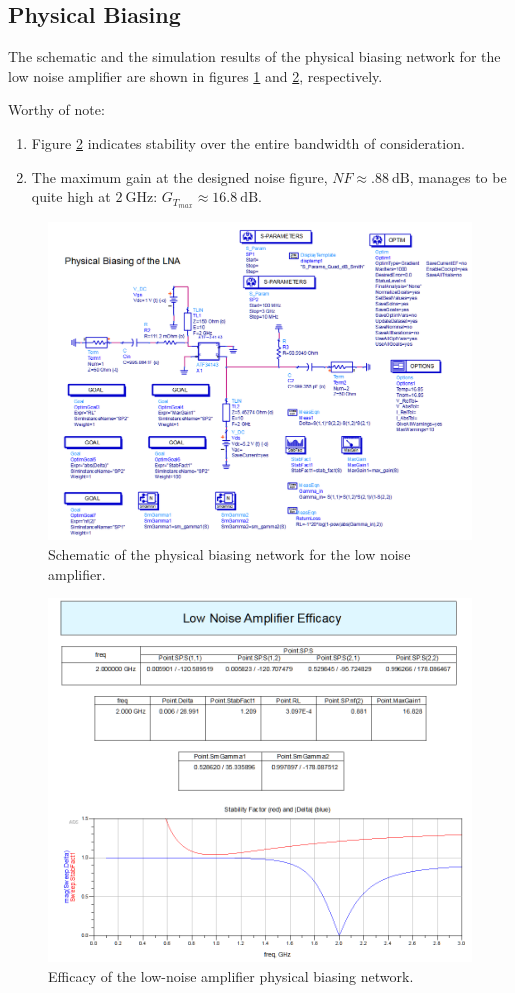 \subsection{Physical Biasing}

The schematic and the simulation results of the physical biasing network for the
low noise amplifier are shown in figures \ref{fig:A2P2PhysicalSchematic} and
\ref{fig:A2P2PhysicalResults}, respectively.

Worthy of note: 
\begin{enumerate}
    \item   Figure \ref{fig:A2P2PhysicalResults} indicates stability over the
        entire bandwidth of consideration.
    \item   The maximum gain at the designed noise figure, $NF \approx
        \SI{.88}{\deci\bel}$, manages to be quite high at $\SI{2}{\giga\hertz}$:
        $G_{T_{max}} \approx \SI{16.8}{\deci\bel}$.
\end{enumerate}

\begin{figure}[H]
    \centering
    \includegraphics[width=0.8\linewidth]{Images/A2P2PhysicalSchematic.png}
    \caption{Schematic of the physical biasing network for the low noise
    amplifier.}
    \label{fig:A2P2PhysicalSchematic}
\end{figure}

\begin{figure}[H]
    \centering
    \includegraphics[width=0.8\linewidth]{Images/A2P2PhysicalResults.png}
    \caption{Efficacy of the low-noise amplifier physical biasing network.}
    \label{fig:A2P2PhysicalResults}
\end{figure}


